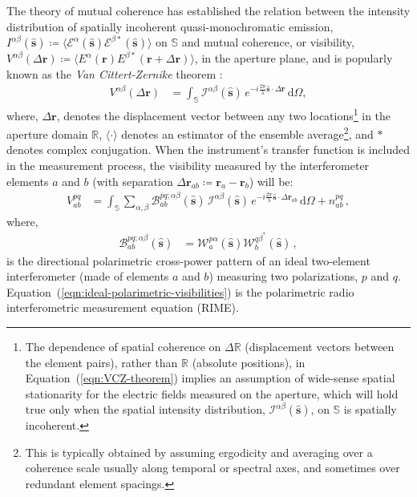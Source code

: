 \documentclass[
  journal=pasa,
  manuscript=article-type,
  year=2020,
  volume=37,
]{cup-journal}
\begin{document}
The theory of mutual coherence has established the relation between the intensity distribution of spatially incoherent quasi-monochromatic emission, $I^{\alpha\beta}(\hat{\boldsymbol{s}})\coloneqq \bigl\langle \mathcal{E}^\alpha(\hat{\boldsymbol{s}}) \mathcal{E}^{\beta *}(\hat{\boldsymbol{s}}) \bigr\rangle$ on $\mathbb{S}$ and mutual coherence, or visibility, $V^{\alpha\beta}(\Delta\boldsymbol{r})\coloneqq \bigl\langle E^\alpha(\boldsymbol{r})E^{\beta *}(\boldsymbol{r}+\Delta\boldsymbol{r})\bigr\rangle$, in the aperture plane, and is popularly known as the \textit{Van Cittert-Zernike} theorem \citep{VanCittert1934,Zernike1938,Born-Wolf,Goodman2000,TMS2017}:
\begin{align}
    V^{\alpha\beta}(\Delta\boldsymbol{r}) &= \int_\mathbb{S} \mathcal{I}^{\alpha\beta}(\hat{\boldsymbol{s}})\, e^{-i\frac{2\pi}{\lambda} \hat{\boldsymbol{s}}\cdot\Delta\boldsymbol{r}} \,\mathrm{d}\Omega, \label{eqn:VCZ-theorem}
\end{align}
where, $\Delta\boldsymbol{r}$, denotes the displacement vector between any two locations\footnote{The dependence of spatial coherence on $\Delta\mathbb{R}$ (displacement vectors between the element pairs), rather than $\mathbb{R}$ (absolute positions), in Equation~(\ref{eqn:VCZ-theorem}) implies an assumption of wide-sense spatial stationarity for the electric fields measured on the aperture, which will hold true only when the spatial intensity distribution, $\mathcal{I}^{\alpha\beta}(\hat{\boldsymbol{s}})$, on $\mathbb{S}$ is spatially incoherent.} in the aperture domain $\mathbb{R}$, $\langle\cdot\rangle$ denotes an estimator of the ensemble average\footnote{This is typically obtained by assuming ergodicity and averaging over a coherence scale usually along temporal or spectral axes, and sometimes over redundant element spacings.}, and $*$ denotes complex conjugation. When the instrument's transfer function is included in the measurement process, the visibility measured by the interferometer elements $a$ and $b$ (with separation $\Delta\boldsymbol{r}_{ab}\coloneqq \boldsymbol{r}_{a}-\boldsymbol{r}_{b}$) will be:
\begin{align}
    V_{ab}^{pq} &= \int_\mathbb{S} \sum_{\alpha,\beta} \mathcal{B}_{ab}^{pq;\alpha\beta}(\hat{\boldsymbol{s}})\,\mathcal{I}^{\alpha\beta}(\hat{\boldsymbol{s}})\, e^{-i\frac{2\pi}{\lambda} \hat{\boldsymbol{s}}\cdot\Delta\boldsymbol{r}_{ab}} \,\mathrm{d}\Omega + n_{ab}^{pq} \, , \label{eqn:ideal-polarimetric-visibilities}
\end{align}
where, 
\begin{align}
    \mathcal{B}_{ab}^{pq;\alpha\beta}(\hat{\boldsymbol{s}}) &=  \mathcal{W}_{a}^{p\alpha}(\hat{\boldsymbol{s}}) \mathcal{W}_{b}^{{q\beta }^*}(\hat{\boldsymbol{s}}) \, ,
\end{align}
is the directional polarimetric cross-power pattern of an ideal two-element interferometer (made of elements $a$ and $b$) measuring two polarizations, $p$ and $q$. Equation~(\ref{eqn:ideal-polarimetric-visibilities}) is the polarimetric radio interferometric measurement equation (RIME).  
\end{document}
